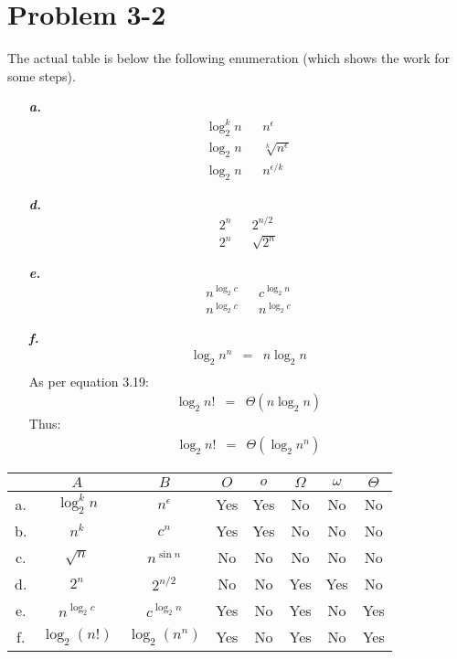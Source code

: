 \documentclass{article}
\begin{document}
\section*{Problem 3-2}

The actual table is below the following enumeration (which shows the work for some steps).

\noindent\begin{enumerate}
	\item[\textbf{\textit{a.}}]
		\begin{eqnarray*}
			\log_2 ^k n & & n^\epsilon \\
			\log_2 n & & \sqrt[k]{n^\epsilon} \\
			\log_2 n & & n^{\epsilon / k}
		\end{eqnarray*}
	\item[\textbf{\textit{d.}}]
		\begin{eqnarray*}
			2^n & & 2^{n/2} \\
			2^n & & \sqrt{2^n}
		\end{eqnarray*}
	\item[\textbf{\textit{e.}}]
		\begin{eqnarray*}
			n^{\log_2 c} & & c^{\log_2 n} \\
			n^{\log_2 c} & & n^{\log_2 c}
		\end{eqnarray*}
	\item[\textbf{\textit{f.}}]
		\begin{eqnarray*}
			\log_2 n^n & = & n \log_2 n \\
		\end{eqnarray*}
		As per equation 3.19:
		\begin{eqnarray*}
			\log_2 n! & = & \Theta(n \log_2 n)
		\end{eqnarray*}
		Thus:
		\begin{eqnarray*}
			\log_2 n! & = & \Theta(\log_2 n^n)
		\end{eqnarray*}
\end{enumerate}

\noindent\begin{tabular}{c|c c|c|c|c|c|c|}
	 & $A$ & $B$ & $O$ & $o$ & $\Omega$ & $\omega$ & $\Theta$ \\ \hline
	a. & $\log_2 ^k n$ & $n^\epsilon$ & Yes & Yes & No & No & No \\ \hline
	b. & $n^k$ & $c^n$ & Yes & Yes & No & No & No \\ \hline
	c. & $\sqrt{n}$ & $n^{\sin n}$ & No & No & No & No & No \\ \hline
	d. & $2^n$ & $2^{n / 2}$ & No & No & Yes & Yes & No \\ \hline
	e. & $n^{\log_2 c}$ & $c^{\log_2 n}$ & Yes & No & Yes & No & Yes \\ \hline
	f. & $\log_2 (n!)$ & $\log_2 (n^n)$ & Yes & No & Yes & No & Yes \\ \hline
\end{tabular}
\end{document}
